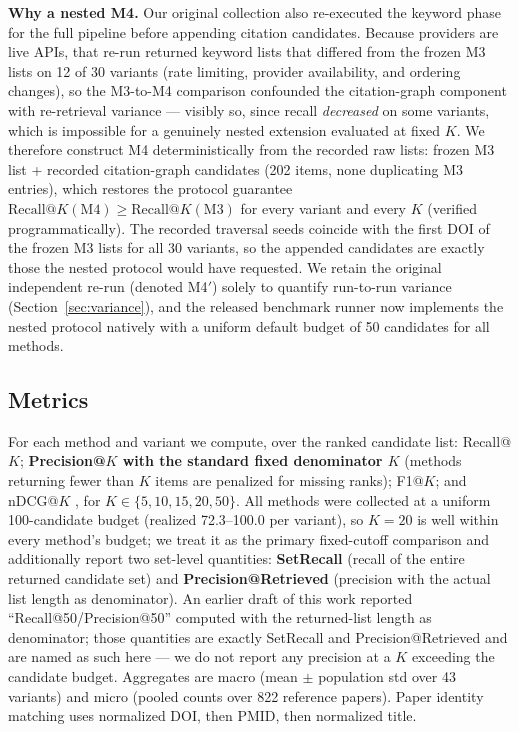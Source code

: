 \documentclass[sigconf,screen]{acmart}
\begin{document}
\textbf{Why a nested M4.} Our original collection also re-executed the
keyword phase for the full pipeline before appending citation candidates.
Because providers are live APIs, that re-run returned keyword lists that
differed from the frozen M3 lists on 12 of 30 variants (rate limiting,
provider availability, and ordering changes), so the M3-to-M4 comparison
confounded the citation-graph component with re-retrieval variance ---
visibly so, since recall \emph{decreased} on some variants, which is
impossible for a genuinely nested extension evaluated at fixed $K$. We
therefore construct M4 deterministically from the recorded raw lists:
frozen M3 list + recorded citation-graph candidates (202 items, none
duplicating M3 entries), which restores the protocol guarantee
$\text{Recall@}K(\text{M4}) \ge \text{Recall@}K(\text{M3})$ for every
variant and every $K$ (verified programmatically). The recorded traversal
seeds coincide with the first DOI of the frozen M3 lists for all 30
variants, so the appended candidates are exactly those the nested protocol
would have requested. We retain the original independent re-run (denoted
M4$'$) solely to quantify run-to-run variance
(Section~\ref{sec:variance}), and the released benchmark runner now
implements the nested protocol natively with a uniform default budget of
50 candidates for all methods.

\subsection{Metrics}
\label{sec:metrics}

For each method and variant we compute, over the ranked candidate list:
Recall@$K$; \textbf{Precision@$K$ with the standard fixed denominator $K$}
(methods returning fewer than $K$ items are penalized for missing ranks);
F1@$K$; and nDCG@$K$ \cite{jarvelin2002cumulated}, for
$K \in \{5, 10, 15, 20, 50\}$. All methods were collected at a uniform
100-candidate budget (realized 72.3--100.0 per variant), so $K{=}20$ is
well within every method's budget; we treat it as the primary fixed-cutoff
comparison and additionally report two set-level quantities:
\textbf{SetRecall} (recall of the entire returned candidate set) and
\textbf{Precision@Retrieved} (precision with the actual list length as
denominator). An earlier draft of this work reported
``Recall@50/Precision@50'' computed with the returned-list length as
denominator; those quantities are exactly SetRecall and
Precision@Retrieved and are named as such here --- we do not report any
precision at a $K$ exceeding the candidate budget. Aggregates are macro
(mean $\pm$ population std over 43 variants) and micro (pooled counts over
822 reference papers). Paper identity matching uses normalized DOI, then
PMID, then normalized title.
\end{document}

